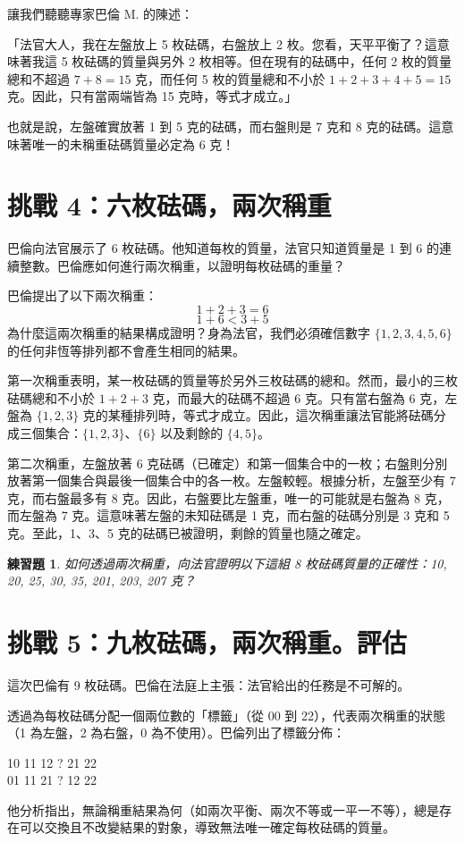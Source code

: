 \documentclass[UTF8, a4paper, 12pt]{article}
\newtheorem*{exercise}{練習題}
\begin{document}
讓我們聽聽專家巴倫 M. 的陳述：

「法官大人，我在左盤放上 5 枚砝碼，右盤放上 2 枚。您看，天平平衡了？這意味著我這 5 枚砝碼的質量與另外 2 枚相等。但在現有的砝碼中，任何 2 枚的質量總和不超過 $7 + 8 = 15$ 克，而任何 5 枚的質量總和不小於 $1 + 2 + 3 + 4 + 5 = 15$ 克。因此，只有當兩端皆為 15 克時，等式才成立。」

也就是說，左盤確實放著 1 到 5 克的砝碼，而右盤則是 7 克和 8 克的砝碼。這意味著唯一的未稱重砝碼質量必定為 6 克！

\section{挑戰 4：六枚砝碼，兩次稱重}
巴倫向法官展示了 6 枚砝碼。他知道每枚的質量，法官只知道質量是 1 到 6 的連續整數。巴倫應如何進行兩次稱重，以證明每枚砝碼的重量？

巴倫提出了以下兩次稱重：
$$1 + 2 + 3 = 6$$
$$1 + 6 < 3 + 5$$
為什麼這兩次稱重的結果構成證明？身為法官，我們必須確信數字 $\{1, 2, 3, 4, 5, 6\}$ 的任何非恆等排列都不會產生相同的結果。

第一次稱重表明，某一枚砝碼的質量等於另外三枚砝碼的總和。然而，最小的三枚砝碼總和不小於 $1 + 2 + 3$ 克，而最大的砝碼不超過 6 克。只有當右盤為 6 克，左盤為 $\{1, 2, 3\}$ 克的某種排列時，等式才成立。因此，這次稱重讓法官能將砝碼分成三個集合：$\{1, 2, 3\}$、$\{6\}$ 以及剩餘的 $\{4, 5\}$。

第二次稱重，左盤放著 6 克砝碼（已確定）和第一個集合中的一枚；右盤則分別放著第一個集合與最後一個集合中的各一枚。左盤較輕。根據分析，左盤至少有 7 克，而右盤最多有 8 克。因此，右盤要比左盤重，唯一的可能就是右盤為 8 克，而左盤為 7 克。這意味著左盤的未知砝碼是 1 克，而右盤的砝碼分別是 3 克和 5 克。至此，1、3、5 克的砝碼已被證明，剩餘的質量也隨之確定。

\begin{exercise}
如何透過兩次稱重，向法官證明以下這組 8 枚砝碼質量的正確性：10, 20, 25, 30, 35, 201, 203, 207 克？
\end{exercise}

\section{挑戰 5：九枚砝碼，兩次稱重。評估}
這次巴倫有 9 枚砝碼。巴倫在法庭上主張：法官給出的任務是不可解的。

透過為每枚砝碼分配一個兩位數的「標籤」（從 00 到 22），代表兩次稱重的狀態（1 為左盤，2 為右盤，0 為不使用）。巴倫列出了標籤分佈：
\begin{center}
10 11 12 \quad ?  21 22  \\
01 11 21 \quad ?  12 22
\end{center}
他分析指出，無論稱重結果為何（如兩次平衡、兩次不等或一平一不等），總是存在可以交換且不改變結果的對象，導致無法唯一確定每枚砝碼的質量。
\end{document}
